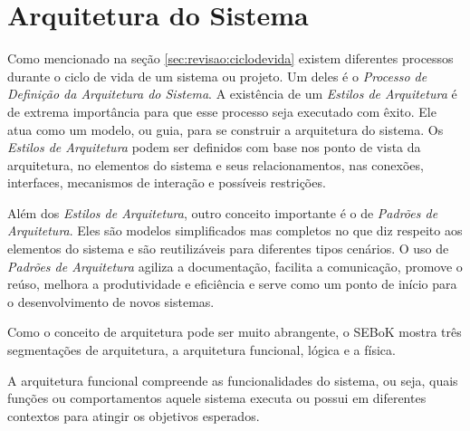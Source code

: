 	\section{Arquitetura do Sistema}\label{sec:revisao:arqSistema}

	Como mencionado na seção \ref{sec:revisao:ciclodevida} existem diferentes processos durante o ciclo de vida de um sistema ou projeto. Um deles é o 
	\textit{Processo de Definição da Arquitetura do Sistema}. A existência de um  \textit{Estilos de Arquitetura} é de extrema importância para que esse processo seja executado com êxito. Ele
	atua como um modelo, ou guia, para se construir a arquitetura do sistema. Os \textit{Estilos de Arquitetura} podem ser definidos com base nos ponto de vista da arquitetura, no elementos do
	sistema e seus relacionamentos, nas conexões, interfaces, mecanismos de interação e possíveis restrições.
	
	Além dos \textit{Estilos de Arquitetura}, outro conceito importante é o de \textit{Padrões de Arquitetura}. Eles são modelos simplificados mas completos no que diz respeito aos elementos do
	sistema e são reutilizáveis para diferentes tipos cenários. O uso de \textit{Padrões de Arquitetura} agiliza  a documentação, facilita a comunicação, promove o reúso, melhora a produtividade
	e eficiência e serve como um ponto de início para o desenvolvimento de novos sistemas.

	Como o conceito de arquitetura pode ser muito abrangente, o SEBoK \cite{sebok2024} mostra três segmentações de arquitetura, a arquitetura funcional, lógica e a física.

	A arquitetura funcional compreende as funcionalidades do sistema, ou seja, quais funções ou comportamentos aquele sistema executa ou possui em diferentes contextos para atingir os objetivos
	esperados.
	

